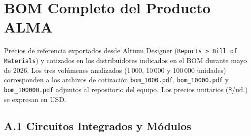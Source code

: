 \chapter{BOM Completo del Producto ALMA}
\label{chap:anexo_bom}

\begin{infobox}
  Precios de referencia exportados desde Altium Designer
  (\texttt{Reports > Bill of Materials}) y cotizados en los distribuidores
  indicados en el BOM durante mayo de 2026. Los tres volúmenes analizados
  (1\,000, 10\,000 y 100\,000 unidades) corresponden a los archivos de
  cotización \texttt{bom\_1000.pdf}, \texttt{bom\_10000.pdf} y
  \texttt{bom\_100000.pdf} adjuntos al repositorio del equipo.
  Los precios unitarios (\$/ud.) se expresan en USD.
\end{infobox}

\section*{A.1 Circuitos Integrados y Módulos}

